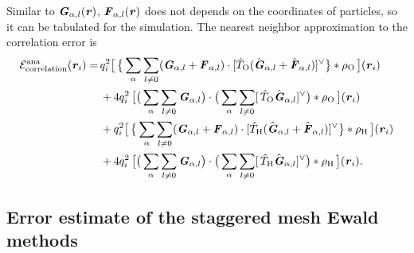 \documentclass[aps,pre,preprint,unsortedaddress]{revtex4}
\renewcommand{\v}[1]{\textbf{\textit{#1}}}
\begin{document}
Similar to $\v G_{\alpha,l}(\v r)$,
$\v F_{\alpha,l} (\v r)$ 
does not depends on the coordinates of particles,
so it can be tabulated  for the simulation.
The nearest neighbor approximation to the correlation error is
\begin{align}\nonumber
  \mathcal E^{\textrm{ana}}_{\textrm{correlation}}(\v r_i)
  =\,&
  q_i^2
  \big[\,
  \big\{
  \sum_{\alpha} \sum_{l\neq 0}
  (\v G_{\alpha,l}+\v F_{\alpha,l})\cdot
  [\hat T_{\textrm{O}} (\hat{\v G}_{\alpha,l}+\hat{\v F}_{\alpha,l})]^{\vee}
  \big\}
  \ast \rho_{\textrm{O}}
  \,\big] (\v r_i) \\\nonumber
  \,&+
  4q_i^2\,
  \big[
  \big(
  \sum_{\alpha} \sum_{l\neq 0}  
  \v G_{\alpha,l}
  \big)
  \cdot
  \big(
  \sum_{\alpha} \sum_{l\neq 0}  
  [\,\hat T_{\textrm{O}}\hat{\v G}_{\alpha,l}]^{\vee}
  \big)
  \ast \rho_{\textrm{O}}\,
  \big] (\v r_i) \\\nonumber
  \,&+
  q_i^2
  \big[\,
  \big\{
  \sum_{\alpha} \sum_{l\neq 0}
  (\v G_{\alpha,l}+\v F_{\alpha,l})\cdot
  [\hat T_{\textrm{H}} (\hat{\v G}_{\alpha,l}+\hat{\v F}_{\alpha,l})]^{\vee}
  \big\}
  \ast \rho_{\textrm{H}}
  \,\big] (\v r_i) \\
  \,&+
  4q_i^2\,
  \big[
  \big(
  \sum_{\alpha} \sum_{l\neq 0}  
  \v G_{\alpha,l}
  \big)
  \cdot
  \big(
  \sum_{\alpha} \sum_{l\neq 0}  
  [\,\hat T_{\textrm{H}}\hat{\v G}_{\alpha,l}]^{\vee}
  \big)
  \ast \rho_{\textrm{H}}\,
  \big] (\v r_i).
\end{align}



\subsection{Error estimate of the staggered mesh Ewald methods}
\end{document}
